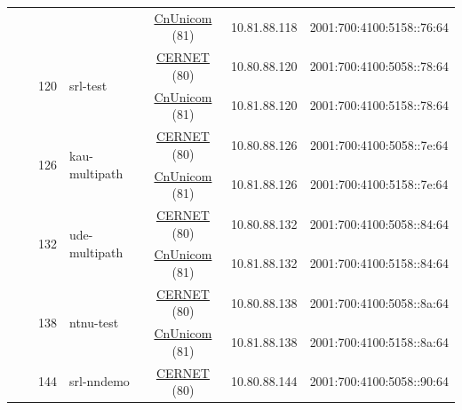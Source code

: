 \begin{small}
\begin{center}
\begin{longtable}{|c|c|c|c|c|c|c|c|}
  &  &  &  & \multicolumn{2}{|c|}{\tiny{\href{http://www.chinaunicom.com}{CnUnicom} (81)}} & \tiny{10.81.88.118} & \tiny{2001:700:4100:5158::76:64} \\* \cline{3-3}\cline{4-4}\cline{5-5}\cline{6-6}\cline{7-7}\cline{8-8}
  &  & \multirow{2}{*}{\tiny{120}} & \multicolumn{1}{|l|}{\multirow{2}{*}{\tiny{srl-test}}} & \multicolumn{2}{|c|}{\tiny{\href{http://www.cernet.edu.cn}{CERNET} (80)}} & \tiny{10.80.88.120} & \tiny{2001:700:4100:5058::78:64} \\* \cline{5-5}\cline{6-6}\cline{7-7}\cline{8-8}
  &  &  &  & \multicolumn{2}{|c|}{\tiny{\href{http://www.chinaunicom.com}{CnUnicom} (81)}} & \tiny{10.81.88.120} & \tiny{2001:700:4100:5158::78:64} \\* \cline{3-3}\cline{4-4}\cline{5-5}\cline{6-6}\cline{7-7}\cline{8-8}
  &  & \multirow{2}{*}{\tiny{126}} & \multicolumn{1}{|l|}{\multirow{2}{*}{\tiny{kau-multipath}}} & \multicolumn{2}{|c|}{\tiny{\href{http://www.cernet.edu.cn}{CERNET} (80)}} & \tiny{10.80.88.126} & \tiny{2001:700:4100:5058::7e:64} \\* \cline{5-5}\cline{6-6}\cline{7-7}\cline{8-8}
  &  &  &  & \multicolumn{2}{|c|}{\tiny{\href{http://www.chinaunicom.com}{CnUnicom} (81)}} & \tiny{10.81.88.126} & \tiny{2001:700:4100:5158::7e:64} \\* \cline{3-3}\cline{4-4}\cline{5-5}\cline{6-6}\cline{7-7}\cline{8-8}
  &  & \multirow{2}{*}{\tiny{132}} & \multicolumn{1}{|l|}{\multirow{2}{*}{\tiny{ude-multipath}}} & \multicolumn{2}{|c|}{\tiny{\href{http://www.cernet.edu.cn}{CERNET} (80)}} & \tiny{10.80.88.132} & \tiny{2001:700:4100:5058::84:64} \\* \cline{5-5}\cline{6-6}\cline{7-7}\cline{8-8}
  &  &  &  & \multicolumn{2}{|c|}{\tiny{\href{http://www.chinaunicom.com}{CnUnicom} (81)}} & \tiny{10.81.88.132} & \tiny{2001:700:4100:5158::84:64} \\* \cline{3-3}\cline{4-4}\cline{5-5}\cline{6-6}\cline{7-7}\cline{8-8}
  &  & \multirow{2}{*}{\tiny{138}} & \multicolumn{1}{|l|}{\multirow{2}{*}{\tiny{ntnu-test}}} & \multicolumn{2}{|c|}{\tiny{\href{http://www.cernet.edu.cn}{CERNET} (80)}} & \tiny{10.80.88.138} & \tiny{2001:700:4100:5058::8a:64} \\* \cline{5-5}\cline{6-6}\cline{7-7}\cline{8-8}
  &  &  &  & \multicolumn{2}{|c|}{\tiny{\href{http://www.chinaunicom.com}{CnUnicom} (81)}} & \tiny{10.81.88.138} & \tiny{2001:700:4100:5158::8a:64} \\* \cline{3-3}\cline{4-4}\cline{5-5}\cline{6-6}\cline{7-7}\cline{8-8}
  &  & \multirow{2}{*}{\tiny{144}} & \multicolumn{1}{|l|}{\multirow{2}{*}{\tiny{srl-nndemo}}} & \multicolumn{2}{|c|}{\tiny{\href{http://www.cernet.edu.cn}{CERNET} (80)}} & \tiny{10.80.88.144} & \tiny{2001:700:4100:5058::90:64} \\* \cline{5-5}\cline{6-6}\cline{7-7}\cline{8-8}

\end{longtable}
\end{center}
\end{small}

